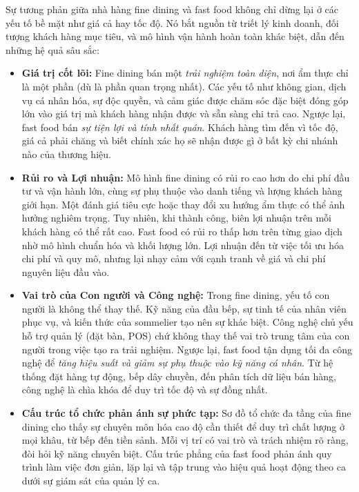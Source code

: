 Sự tương phản giữa nhà hàng fine dining và fast food không chỉ dừng lại ở các yếu tố bề mặt như giá cả hay tốc độ. Nó bắt nguồn từ triết lý kinh doanh, đối tượng khách hàng mục tiêu, và mô hình vận hành hoàn toàn khác biệt, dẫn đến những hệ quả sâu sắc:

\begin{itemize}
    \item \textbf{Giá trị cốt lõi:} Fine dining bán một \textit{trải nghiệm toàn diện}, nơi ẩm thực chỉ là một phần (dù là phần quan trọng nhất). Các yếu tố như không gian, dịch vụ cá nhân hóa, sự độc quyền, và cảm giác được chăm sóc đặc biệt đóng góp lớn vào giá trị mà khách hàng nhận được và sẵn sàng chi trả cao. Ngược lại, fast food bán \textit{sự tiện lợi và tính nhất quán}. Khách hàng tìm đến vì tốc độ, giá cả phải chăng và biết chính xác họ sẽ nhận được gì ở bất kỳ chi nhánh nào của thương hiệu.

    \item \textbf{Rủi ro và Lợi nhuận:} Mô hình fine dining có rủi ro cao hơn do chi phí đầu tư và vận hành lớn, cùng sự phụ thuộc vào danh tiếng và lượng khách hàng giới hạn. Một đánh giá tiêu cực hoặc thay đổi xu hướng ẩm thực có thể ảnh hưởng nghiêm trọng. Tuy nhiên, khi thành công, biên lợi nhuận trên mỗi khách hàng có thể rất cao. Fast food có rủi ro thấp hơn trên từng giao dịch nhờ mô hình chuẩn hóa và khối lượng lớn. Lợi nhuận đến từ việc tối ưu hóa chi phí và quy mô, nhưng lại nhạy cảm với cạnh tranh về giá và chi phí nguyên liệu đầu vào.

    \item \textbf{Vai trò của Con người và Công nghệ:} Trong fine dining, yếu tố con người là không thể thay thế. Kỹ năng của đầu bếp, sự tinh tế của nhân viên phục vụ, và kiến thức của sommelier tạo nên sự khác biệt. Công nghệ chủ yếu hỗ trợ quản lý (đặt bàn, POS) chứ không thay thế vai trò trung tâm của con người trong việc tạo ra trải nghiệm. Ngược lại, fast food tận dụng tối đa công nghệ để \textit{tăng hiệu suất và giảm sự phụ thuộc vào kỹ năng cá nhân}. Từ hệ thống đặt hàng tự động, bếp dây chuyền, đến phân tích dữ liệu bán hàng, công nghệ là chìa khóa để duy trì tốc độ và sự đồng nhất.

    \item \textbf{Cấu trúc tổ chức phản ánh sự phức tạp:} Sơ đồ tổ chức đa tầng của fine dining cho thấy sự chuyên môn hóa cao độ cần thiết để duy trì chất lượng ở mọi khâu, từ bếp đến tiền sảnh. Mỗi vị trí có vai trò và trách nhiệm rõ ràng, đòi hỏi kỹ năng chuyên biệt. Cấu trúc phẳng của fast food phản ánh quy trình làm việc đơn giản, lặp lại và tập trung vào hiệu quả hoạt động theo ca dưới sự giám sát của quản lý ca.


\end{itemize}
